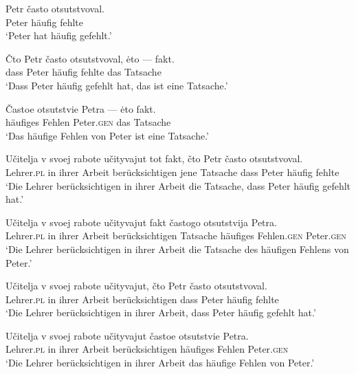 \documentclass[output=paper]{langscibook}
\begin{document}
\begin{otherlanguage}{german}
\ea \label{ex:zi83:26}
    \gll Petr často otsutstvoval. \\
    Peter häufig  fehlte \\
    \glt ‘Peter hat häufig gefehlt.’
    
\ex \label{ex:zi83:27}
    \ea \label{ex:zi83:27a}
        \gll Čto Petr často otsutstvoval, ėto — fakt. \\
        dass Peter häufig fehlte das {}  Tatsache \\
        \glt ‘Dass Peter häufig gefehlt hat, das ist eine Tatsache.’
        
    \ex \label{ex:zi83:27b}
        \gll Častoe otsutstvie Petra — ėto fakt. \\
        häufiges Fehlen Peter.\textsc{gen} {} das  Tatsache \\
        \glt ‘Das häufige Fehlen von Peter ist eine Tatsache.’
        
    \z

\ex \label{ex:zi83:28}
    \ea \label{ex:zi83:28a}
        \gll Učitelja v svoej rabote učityvajut tot fakt, čto Petr často otsutstvoval. \\
        Lehrer.\textsc{pl} in ihrer Arbeit berücksichtigen jene Tatsache dass Peter häufig fehlte \\
        \glt ‘Die Lehrer berücksichtigen in ihrer Arbeit die Tatsache, dass Peter häufig gefehlt hat.’
        
    \ex \label{ex:zi83:28b}
        \gll Učitelja v svoej rabote učityvajut fakt častogo otsutstvija Petra. \\
         Lehrer.\textsc{pl} in ihrer Arbeit berücksichtigen Tatsache häufiges Fehlen.\textsc{gen} Peter.\textsc{gen} \\
         \glt ‘Die Lehrer berücksichtigen in ihrer Arbeit die Tatsache des häufigen Fehlens von Peter.’
        
    \z

\ex \label{ex:zi83:29}
    \ea \label{ex:zi83:29a}
        \gll Učitelja v svoej rabote učityvajut, čto Petr často otsutstvoval. \\
        Lehrer.\textsc{pl} in ihrer Arbeit berücksichtigen dass Peter häufig fehlte \\
        \glt ‘Die Lehrer berücksichtigen in ihrer Arbeit, dass Peter häufig gefehlt hat.’
        
    \ex \label{ex:zi83:29b}
        \gll Učitelja v svoej rabote učityvajut častoe otsutstvie Petra. \\
        Lehrer.\textsc{pl} in ihrer Arbeit berücksichtigen  häufiges Fehlen Peter.\textsc{gen} \\
        \glt ‘Die Lehrer berücksichtigen in ihrer Arbeit das häufige Fehlen von Peter.’
    

\end{otherlanguage}
\end{document}

